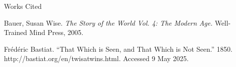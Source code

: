 \documentclass[12pt]{article}
\newcommand{\bibent}{\noindent \hangindent 40pt}
\newenvironment{workscited}{\newpage \begin{center} Works Cited \end{center}}{\newpage }
\begin{document}
\begin{flushleft}
\begin{workscited}

\bibent
Bauer, Susan Wise. \textit{The Story of the World Vol. 4: The Modern Age.} Well-Trained Mind Press, 2005.

\bibent
Frédéric Bastiat. ``That Which is Seen, and That Which is Not Seen.'' 1850. http://bastiat.org/en/twisatwins.html. Accessed 9 May 2025.



\end{workscited}

\end{flushleft}
\end{document}

